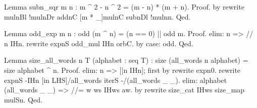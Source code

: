 \begin{Answer}[ref=ex:rewrite]

\begin{coq}{}{}
Lemma subn_sqr m n : m ^ 2 - n ^ 2 = (m - n) * (m + n).
Proof. by rewrite mulnBl !mulnDr addnC [m * _]mulnC subnDl !mulnn. Qed.
\end{coq}
\end{Answer}

\begin{Answer}[ref=ex:induction]

\begin{coq}{}{}
Lemma odd_exp m n : odd (m ^ n) = (n == 0) || odd m.
Proof.
elim: n => // n IHn.
rewrite expnS odd_mul {}IHn orbC.
by case: odd.
Qed.
\end{coq}
\end{Answer}

\begin{Answer}[ref=ex:induction2]

\begin{coq}{}{}
Lemma size_all_words n T (alphabet : seq T) :
  size (all_words n alphabet) = size alphabet ^ n.
Proof.
elim: n => [|n IHn]; first by rewrite expn0.
rewrite expnS -{}IHn [in LHS]/all_words iterS -/(all_words _ _).
elim: alphabet (all_words _ _) => //= w ws IHws aw.
by rewrite size_cat IHws size_map mulSn.
Qed.
\end{coq}
\end{Answer}










